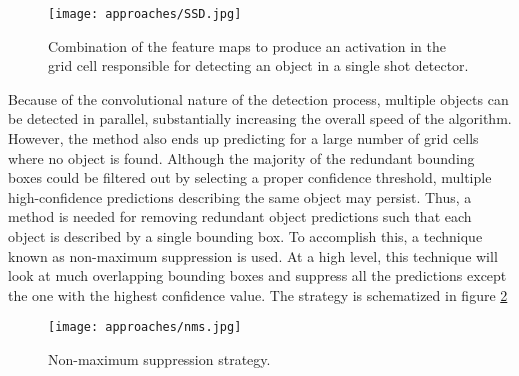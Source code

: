 \begin{figure}[h]
	\caption{Combination of the feature maps to produce an activation in the grid cell responsible for detecting an object in a single shot detector.}
	\centering
	\texttt{[image: approaches/SSD.jpg]}
	\label{fig:ssd}
\end{figure}

Because of the convolutional nature of the detection process, multiple objects can be detected in parallel, substantially increasing the overall speed of the algorithm. However, the method also ends up predicting for a large number of grid cells where no object is found. Although the majority of the redundant bounding boxes could be filtered out by selecting a proper confidence threshold, multiple high-confidence predictions describing the same object may persist. Thus, a method is needed for removing redundant object predictions such that each object is described by a single bounding box. To accomplish this, a technique known as non-maximum suppression is used. At a high level, this technique will look at much overlapping bounding boxes and suppress all the predictions except the one with the highest confidence value. The strategy is schematized in figure \ref{fig:nms}

\begin{figure}[h]
	\caption{Non-maximum suppression strategy.}
	\centering
	\texttt{[image: approaches/nms.jpg]}
	\label{fig:nms}
\end{figure}

